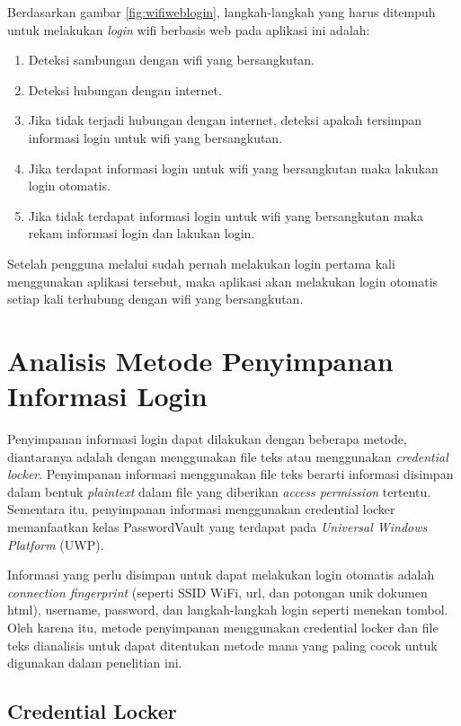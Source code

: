 Berdasarkan gambar \ref{fig:wifiweblogin}, langkah-langkah yang harus ditempuh untuk melakukan \textit{login} wifi berbasis web pada aplikasi ini adalah:

\begin{enumerate}
    \item{Deteksi sambungan dengan wifi yang bersangkutan.}
    \item{Deteksi hubungan dengan internet.}
    \item{Jika tidak terjadi hubungan dengan internet, deteksi apakah tersimpan informasi login untuk wifi yang bersangkutan.}
    \item{Jika terdapat informasi login untuk wifi yang bersangkutan maka lakukan login otomatis.}
    \item{Jika tidak terdapat informasi login untuk wifi yang bersangkutan maka rekam informasi login dan lakukan login.}
\end{enumerate}

Setelah pengguna melalui sudah pernah melakukan login pertama kali menggunakan aplikasi tersebut, maka aplikasi akan melakukan login otomatis setiap kali terhubung dengan wifi yang bersangkutan.



\section{Analisis Metode Penyimpanan Informasi Login}
\label{sec:metode_penyimpanan}

Penyimpanan informasi login dapat dilakukan dengan beberapa metode, diantaranya adalah dengan menggunakan file teks atau menggunakan \textit{credential locker}. Penyimpanan informasi menggunakan file teks berarti informasi disimpan dalam bentuk \textit{plaintext} dalam file yang diberikan \textit{access permission} tertentu. Sementara itu, penyimpanan informasi menggunakan credential locker memanfaatkan kelas PasswordVault yang terdapat pada \textit{Universal Windows Platform} (UWP).

Informasi yang perlu disimpan untuk dapat melakukan login otomatis adalah \textit{connection fingerprint} (seperti SSID WiFi, url, dan potongan unik dokumen html), username, password, dan langkah-langkah login seperti menekan tombol. Oleh karena itu, metode penyimpanan menggunakan credential locker dan file teks dianalisis untuk dapat ditentukan metode mana yang paling cocok untuk digunakan dalam penelitian ini.

\subsection{Credential Locker}
\label{subsec:credential_locker}

